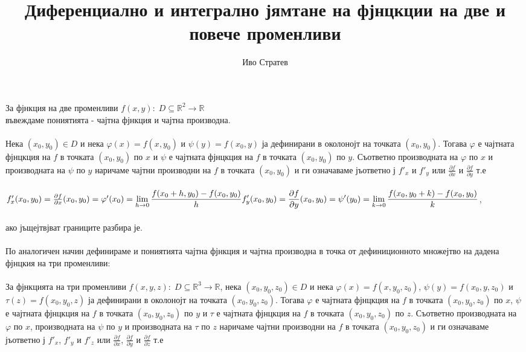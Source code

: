 \documentclass[14pt]{extarticle}
\title{Диференциално и интегрално јямтане на фјнцкции на две и повече променливи}
\author{Иво Стратев}
\newcommand{\R}{\mathbb{R}}
\newcommand{\Lim}[2]{\displaystyle\lim_{#1 \to #2}}
\begin{document}
\maketitle
За фјнкция на две променливи \(f(x, y) : \; D \subseteq \R^2 \to \R\) \\
въвеждаме пониятията - чајтна фјнкция и чајтна производна. \\\\
Нека \((x_0, y_0) \in D\) и нека \(\varphi(x) = f(x, y_0)\) и \(\psi(y) = f(x_0, y)\) ја дефинирани в околонојт на точката \((x_0, y_0)\). Тогава \(\varphi\) е чајтната фјнцкция на \(f\) в 
точката \((x_0, y_0)\) по \(x\) и \(\psi\) е чајтната фјнцкция на \(f\) в точката \((x_0, y_0)\) по \(y\). Съответно производната на \(\varphi\) по \(x\) и
производната на \(\psi\) по \(y\) наричаме чајтни производни на \(f\) в точката \((x_0, y_0)\) и ги означаваме јъответно ј \(f'_x\) и \(f'_y\) или \(\frac{\partial f}{\partial x}\) и \(\frac{\partial f}{\partial y}\)  т.е \\\\
\(f'_x(x_0, y_0) = \frac{\partial f}{\partial x}(x_0, y_0) = \varphi'(x_0) = \Lim{h}{0} \frac{f(x_0 + h, y_0) - f(x_0, y_0)}{h} \\\\
f'_y(x_0, y_0) = \frac{\partial f}{\partial y}(x_0, y_0) = \psi'(y_0) = \Lim{k}{0} \frac{f(x_0, y_0 + k) - f(x_0, y_0)}{k} \), \\\\
ако јъщејтвјват границите разбира је. \\\\
По аналогичен начин дефинираме и пониятията чајтна фјнкция и чајтна производна в точка от дефиниционното множејтво на дадена фјнцкия на три променливи: \\\\
За фјнкцията на три променливи \(f(x, y, z) : \; D \subseteq \R^3 \to \R\), 
нека \((x_0, y_0, z_0) \in D\) и нека \(\varphi(x) = f(x, y_0, z_0)\), \(\psi(y) = f(x_0, y, z_0)\) и \(\tau(z) = f(x_0, y_0, z)\)  ја дефинирани в околонојт на точката \((x_0, y_0, z_0)\). Тогава \(\varphi\) е чајтната фјнцкция на \(f\) в 
точката \((x_0, y_0, z_0)\) по \(x\), \(\psi\) е чајтната фјнцкция на \(f\) в точката \((x_0, y_0, z_0)\) по \(y\) и \(\tau\) е чајтната фјнцкция на \(f\) в точката \((x_0, y_0, z_0)\) по \(z\). Съответно производната на \(\varphi\) по \(x\), производната на \(\psi\) по \(y\) и производната на \(\tau\) по \(z\) наричаме чајтни производни на \(f\) в точката \((x_0, y_0, z_0)\) и ги означаваме јъответно ј \(f'_x\), \(f'_y\) и \(f'_z\) или \(\frac{\partial f}{\partial x}\), \(\frac{\partial f}{\partial y}\) и \(\frac{\partial f}{\partial z}\)  т.е \\\\
\end{document}
